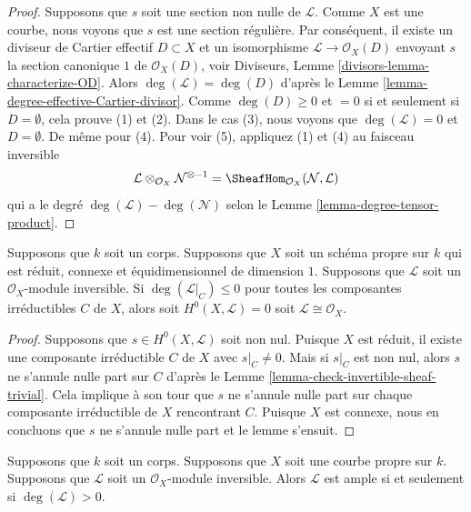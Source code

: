\begin{proof}
Supposons que $s$ soit une section non nulle de
$\mathcal{L}$. Comme $X$ est une courbe, nous voyons que
$s$ est une section régulière. Par conséquent, il existe
un diviseur de Cartier effectif $D \subset X$ et un
isomorphisme $\mathcal{L} \to \mathcal{O}_X(D)$ envoyant
$s$ la section canonique $1$ de $\mathcal{O}_X(D)$, voir
Diviseurs, Lemme \ref{divisors-lemma-characterize-OD}.
Alors $\deg(\mathcal{L}) = \deg(D)$ d'après le Lemme
\ref{lemma-degree-effective-Cartier-divisor}. Comme
$\deg(D) \geq 0$ et $= 0$ si et seulement si $D =
\emptyset$, cela prouve (1) et (2). Dans le cas (3), nous
voyons que $\deg(\mathcal{L}) = 0$ et $D = \emptyset$. De même
pour (4). Pour voir (5), appliquez (1) et (4) au faisceau inversible
$$
\mathcal{L} \otimes_{\mathcal{O}_X} \mathcal{N}^{\otimes -1} =
\SheafHom_{\mathcal{O}_X}(\mathcal{N}, \mathcal{L})
$$
qui a le degré $\deg(\mathcal{L}) -
\deg(\mathcal{N})$ selon le Lemme \ref{lemma-degree-tensor-product}.
\end{proof}

\begin{lemma}
\label{lemma-no-sections-dual-nef}
Supposons que $k$ soit un corps. Supposons que $X$ soit un
schéma propre sur $k$ qui est réduit, connexe et
équidimensionnel de dimension $1$. Supposons que $\mathcal{L}$ soit
un $\mathcal{O}_X$-module inversible. Si $\deg(\mathcal{L}|_C) \leq
0$ pour toutes les composantes irréductibles $C$ de $X$, alors soit
$H^0(X, \mathcal{L}) = 0$ soit $\mathcal{L} \cong \mathcal{O}_X$.
\end{lemma}

\begin{proof}
Supposons que $s \in H^0(X, \mathcal{L})$ soit non
nul. Puisque $X$ est réduit, il existe une composante
irréductible $C$ de $X$ avec $s|_C \not = 0$. Mais si
$s|_C$ est non nul, alors $s$ ne s'annule nulle part
sur $C$ d'après le Lemme
\ref{lemma-check-invertible-sheaf-trivial}. Cela implique à son
tour que $s$ ne s'annule nulle part sur chaque composante
irréductible de $X$ rencontrant $C$. Puisque $X$ est connexe, nous
en concluons que $s$ ne s'annule nulle part et le lemme s'ensuit.
\end{proof}

\begin{lemma}
\label{lemma-ample-curve}
Supposons que $k$ soit un corps. Supposons que $X$ soit une courbe propre
sur $k$. Supposons que $\mathcal{L}$ soit un $\mathcal{O}_X$-module
inversible. Alors $\mathcal{L}$ est ample si et seulement si $\deg(\mathcal{L}) > 0$.
\end{lemma}

